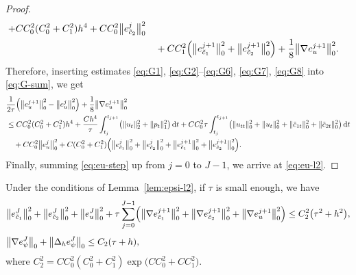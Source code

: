 \begin{proof}
\begin{align}
    + CC_{0}^{2}(C_{0}^{2}+C_{1}^{2})h^{4}
    + CC_{0}^{2}\bigl\|e_{\tilde{c}_{2}}^{j}\bigr\|_{0}^{2}
  \nonumber\\
  &\quad + CC_{1}^{2}\Bigl(\bigl\|e_{\tilde{c}_{1}}^{j+1}\bigr\|_{0}^{2}
                           + \bigl\|e_{\tilde{c}_{2}}^{j+1}\bigr\|_{0}^{2}\Bigr)
         + \frac{1}{8}\bigl\|\nabla e_{u}^{j+1}\bigr\|_{0}^{2}.
  \label{eq:G8}
\end{align}
Therefore, inserting estimates \eqref{eq:G1}, \eqref{eq:G2}--\eqref{eq:G6}, \eqref{eq:G7},
\eqref{eq:G8} into \eqref{eq:G-sum}, we get
\begin{align}
  &\frac{1}{2\tau}\Bigl(\bigl\|e_{u}^{j+1}\bigr\|_{0}^{2}
                       - \bigl\|e_{u}^{j}\bigr\|_{0}^{2}\Bigr)
   + \frac{1}{8}\bigl\|\nabla e_{u}^{j+1}\bigr\|_{0}^{2}
  \nonumber\\
  &\leq CC_{0}^{2}(C_{0}^{2}+C_{1}^{2})h^{4}
   + \frac{Ch^{4}}{\tau}\int_{t_{j}}^{t_{j+1}}
     \bigl(\|u_{t}\|_{2}^{2} + \|p_{t}\|_{1}^{2}\bigr)\,\mathrm{d}t
   + CC_{0}^{2}\tau\int_{t_{j}}^{t_{j+1}}
     \bigl(\|u_{tt}\|_{0}^{2} + \|u_{t}\|_{0}^{2}
          + \|\tilde{c}_{1t}\|_{0}^{2} + \|\tilde{c}_{2t}\|_{0}^{2}\bigr)\,\mathrm{d}t
  \nonumber\\
  &\quad + CC_{0}^{2}\bigl\|e_{u}^{j}\bigr\|_{0}^{2}
   + C(C_{0}^{2}+C_{1}^{2})\Bigl(\bigl\|e_{\tilde{c}_{1}}^{j}\bigr\|_{0}^{2}
                                  + \bigl\|e_{\tilde{c}_{2}}^{j}\bigr\|_{0}^{2}
                                  + \bigl\|e_{\tilde{c}_{1}}^{j+1}\bigr\|_{0}^{2}
                                  + \bigl\|e_{\tilde{c}_{2}}^{j+1}\bigr\|_{0}^{2}\Bigr).
  \label{eq:eu-step}
\end{align}
Finally, summing \eqref{eq:eu-step} up from $j = 0$ to $J-1$, we arrive at \eqref{eq:eu-l2}.
\end{proof}

\begin{theorem}\label{thm:l2}
Under the conditions of Lemma~\ref{lem:epsi-l2}, if $\tau$ is small enough, we have
\begin{align}
  &\bigl\|e_{\tilde{c}_{1}}^{J}\bigr\|_{0}^{2}
   + \bigl\|e_{\tilde{c}_{2}}^{J}\bigr\|_{0}^{2}
   + \bigl\|e_{u}^{J}\bigr\|_{0}^{2}
   + \tau\sum_{j=0}^{J-1}\Bigl(\bigl\|\nabla e_{\tilde{c}_{1}}^{j+1}\bigr\|_{0}^{2}
                               + \bigl\|\nabla e_{\tilde{c}_{2}}^{j+1}\bigr\|_{0}^{2}
                               + \bigl\|\nabla e_{u}^{j+1}\bigr\|_{0}^{2}\Bigr)
   \leq C_{2}^{2}\bigl(\tau^{2} + h^{2}\bigr),
  \label{eq:l2-result}\\[4pt]
  &\bigl\|\nabla e_{\psi}^{J}\bigr\|_{0}
   + \bigl\|\Delta_{h}e_{\psi}^{J}\bigr\|_{0}
   \leq C_{2}(\tau + h),
  \label{eq:l2-psi}
\end{align}
where $C_{2}^{2} = CC_{0}^{2}(C_{0}^{2}+C_{1}^{2})\exp\!\bigl(CC_{0}^{2}+CC_{1}^{2}\bigr)$.
\end{theorem}

